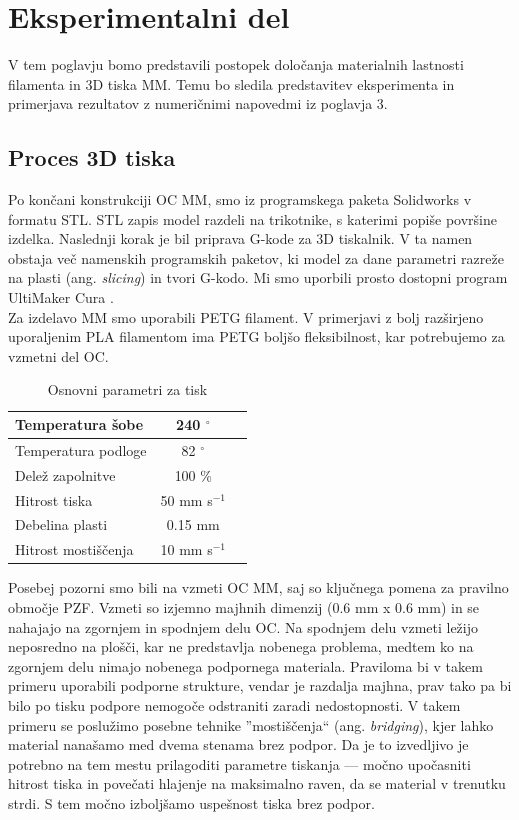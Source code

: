 \documentclass[12pt]{report}
\begin{document}
\chapter{Eksperimentalni del}
V tem poglavju bomo predstavili postopek določanja materialnih lastnosti filamenta in 3D tiska \ac{MM}. Temu bo sledila predstavitev eksperimenta in primerjava rezultatov z numeričnimi 
napovedmi iz poglavja 3.

\section{Proces 3D tiska}
Po končani konstrukciji \ac{OC} \ac{MM}, smo iz programskega paketa Solidworks \cite{solidworks} v formatu STL. STL zapis model razdeli na trikotnike, s katerimi popiše površine izdelka. Naslednji korak je bil priprava G-kode za 3D tiskalnik. V ta namen obstaja več namenskih programskih paketov, ki model za dane parametri razreže na plasti (ang. \emph{slicing}) in tvori
G-kodo. Mi smo uporbili prosto dostopni program UltiMaker Cura \cite{cura}. \\
Za izdelavo \ac{MM} smo uporabili PETG filament. V primerjavi z bolj razširjeno uporaljenim PLA filamentom ima PETG boljšo fleksibilnost, kar potrebujemo za vzmetni del \ac{OC}.

\begin{table}[H]
  \caption{Osnovni parametri za tisk}
  \centering
  \begin{tabular}{ | l | c | r | }
    \hline
    Temperatura šobe & 240 $^{\circ}$ \\ \hline
    Temperatura podloge & 82 $^{\circ}$ \\ \hline
    Delež zapolnitve & 100 \% \\ \hline
    Hitrost tiska & 50 mm s$^{-1}$ \\ \hline
    Debelina plasti & 0.15 mm \\ \hline
    Hitrost mostiščenja & 10 mm s$^{-1}$ \\
    \hline  
  \end{tabular}
\end{table}

\noindent Posebej pozorni smo bili na vzmeti \ac{OC} \ac{MM}, saj so ključnega pomena za pravilno območje \ac{PZF}. Vzmeti so izjemno majhnih dimenzij (0.6 mm x 0.6 mm) in se nahajajo na zgornjem
in spodnjem delu \ac{OC}. Na spodnjem delu vzmeti ležijo neposredno na plošči, kar ne predstavlja nobenega problema, medtem ko na zgornjem delu nimajo nobenega podpornega materiala. Praviloma bi v takem
primeru uporabili podporne strukture, vendar je razdalja majhna, prav tako pa bi bilo po tisku podpore nemogoče odstraniti zaradi nedostopnosti. V takem primeru se poslužimo posebne tehnike ''mostiščenja`` (ang. \emph{bridging}), kjer lahko
material nanašamo med dvema stenama brez podpor. Da je to izvedljivo je potrebno na tem mestu prilagoditi parametre tiskanja --- močno upočasniti hitrost tiska in povečati hlajenje na maksimalno raven, da se material v trenutku strdi. S tem močno izboljšamo
uspešnost tiska brez podpor.
\end{document}
